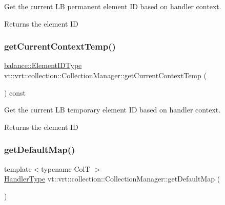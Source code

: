 Get the current LB permanent element ID based on handler context. 

\begin{DoxyReturn}{Returns}
the element ID 
\end{DoxyReturn}
\mbox{\label{structvt_1_1vrt_1_1collection_1_1_collection_manager_a3b98d63294b7f4faf8a64bcb91df69d4}} 
\subsubsection{\texorpdfstring{get\+Current\+Context\+Temp()}{getCurrentContextTemp()}}
{\footnotesize\ttfamily \hyperlink{namespacevt_1_1vrt_1_1collection_1_1balance_a14c8d2c972f2913aa3f1636e5be0a120}{balance\+::\+Element\+I\+D\+Type} vt\+::vrt\+::collection\+::\+Collection\+Manager\+::get\+Current\+Context\+Temp (\begin{DoxyParamCaption}{ }\end{DoxyParamCaption}) const\hspace{0.3cm}{\ttfamily [private]}}



Get the current LB temporary element ID based on handler context. 

\begin{DoxyReturn}{Returns}
the element ID 
\end{DoxyReturn}
\mbox{\label{structvt_1_1vrt_1_1collection_1_1_collection_manager_aa371f1cdd4eafa9f75b7eb40a6f151e0}} 
\subsubsection{\texorpdfstring{get\+Default\+Map()}{getDefaultMap()}}
{\footnotesize\ttfamily template$<$typename ColT $>$ \\
\hyperlink{namespacevt_af64846b57dfcaf104da3ef6967917573}{Handler\+Type} vt\+::vrt\+::collection\+::\+Collection\+Manager\+::get\+Default\+Map (\begin{DoxyParamCaption}{ }\end{DoxyParamCaption})\hspace{0.3cm}{\ttfamily [static]}}



